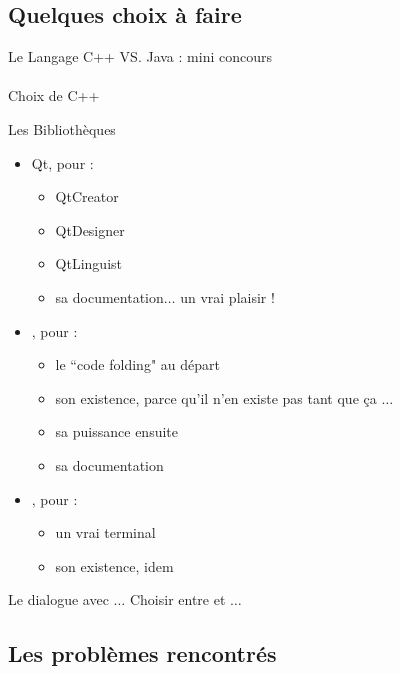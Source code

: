 \subsection{Quelques choix à faire}

    \begin{frame}{Le Langage}
        C++ VS. Java : mini concours
        ~\\
        \pause
        ~\\
        Choix de C++
    \end{frame}
    
    \begin{frame}{Les Bibliothèques}
        \begin{itemize}
        	\item Qt, pour :
        	\begin{itemize}
        		\item QtCreator
        		\item QtDesigner
        		\item QtLinguist
        		\item sa documentation$\ldots$ un vrai plaisir !
    		\end{itemize}
    		\item \qcodeedit, pour :
        	\begin{itemize}
        		\item le ``code folding" au départ
        		\item son existence, parce qu'il n'en existe pas tant que ça $\ldots$
        		\item sa puissance ensuite
        		\item sa documentation
    		\end{itemize}
    		\item \qtermwidget, pour :
        	\begin{itemize}
        		\item un vrai terminal
        		\item son existence, idem
    		\end{itemize}
    	\end{itemize}
	\end{frame}
		
    \begin{frame}{Le dialogue avec \coq}
        $\ldots$ Choisir entre \coqtop et \coqtop $\ldots$
    \end{frame}
        
\subsection{Les problèmes rencontrés}

